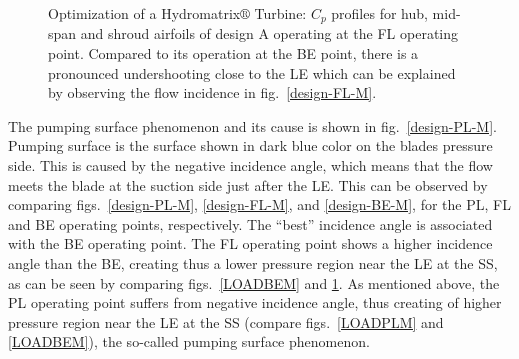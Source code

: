 \begin{figure}[h!]
\begin{minipage}[b]{1\linewidth}
 \centering
\end{minipage}
\caption{Optimization of a Hydromatrix$\circledR$ Turbine: $C_p$ profiles for hub, mid-span and shroud airfoils of design A operating at the FL operating point. Compared to its operation at the BE point, there is a pronounced undershooting close to the LE which can be explained by observing the flow incidence in fig.\ \ref{design-FL-M}.}
\label{LOADFLM}
\end{figure}

The pumping surface phenomenon and its cause is shown in fig.\ \ref{design-PL-M}. Pumping surface is the surface shown in dark blue color on the blades pressure side. This is caused by the negative incidence angle, which means that the flow meets the blade at the suction side just after the LE. This can be observed by comparing figs.\ \ref{design-PL-M}, \ref{design-FL-M}, and \ref{design-BE-M}, for the  PL, FL and BE operating points, respectively. The ``best'' incidence angle is associated with the BE operating point. The FL operating point shows a higher incidence angle than the BE, creating thus a lower pressure region near the LE at the SS, as can be seen by comparing figs.\  \ref{LOADBEM} and \ref{LOADFLM}. As mentioned above, the PL operating point suffers from negative incidence angle, thus creating of higher pressure region near the LE at the SS (compare figs.\ \ref{LOADPLM} and \ref{LOADBEM}), the so-called pumping surface phenomenon.    




